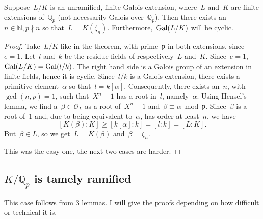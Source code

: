 \begin{theorem}
  Suppose~$L/K$ is an unramified, finite Galois extension, where~$L$ and~$K$ are finite extensions of~$\mathbb{Q}_p$ (not necessarily Galois over~$\mathbb{Q}_p$). Then there exists an~$n \in \mathbb{N},p \nmid n$ so that~$L = K(\zeta_n)$. Furthermore,~$\operatorname{Gal}(L/K)$ will be cyclic.

  \begin{proof}
    Take~$L/K$ like in the theorem, with prime~$\mathfrak{p}$ in both extensions, since~$e=1$. Let~$l$ and~$k$ be the residue fields of respectively~$L$ and~$K$. Since~$e = 1$,~$\operatorname{Gal}(L/K) = \operatorname{Gal}(l/k)$. The right hand side is a Galois group of an extension in finite fields, hence it is cyclic. Since~$l/k$ is a Galois extension, there exists a primitive element~$\alpha$ so that~$l = k[\alpha]$. Consequently, there exists an~$n$, with~$\gcd(n,p)=1$, such that~$X^n-1$ has a root in~$l$, namely~$\alpha$. Using Hensel's lemma, we find a~$\beta \in \mathcal{O}_L$ as a root of~$X^n-1$ and~$\beta \equiv \alpha \bmod \mathfrak{p}$. Since~$\beta$ is a root of~$1$ and, due to being equivalent to~$\alpha$, has order at least~$n$, we have
    \begin{equation}
      \left[K(\beta):K\right] \geq \left[k[\alpha]:k\right] = \left[l:k\right] = \left[L:K\right]. 
    \end{equation}
    But~$\beta \in L$, so we get~$L = K(\beta)$ and~$\beta = \zeta_n$.

    This was the easy one, the next two cases are harder.
  \end{proof}
\end{theorem}

\subsection{$K/\mathbb{Q}_p$ is tamely ramified}
This case follows from 3 lemmas. I will give the proofs depending on how difficult or technical it is.

